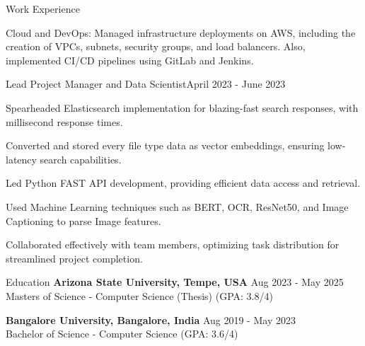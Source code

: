 \documentclass{resume} %
\begin{document}
\begin{rSection}{Work Experience}
\begin{rSubsection}
                                    \item Cloud and DevOps: Managed infrastructure deployments on AWS, including the creation of VPCs, subnets, security groups, and load balancers. Also, implemented CI/CD pipelines using GitLab and Jenkins.
                            \end{rSubsection}
                    \begin{rSubsection}
                {Lead Project Manager and Data Scientist}{April 2023 - June 2023}
                                    {}
                                {}
                                    \item Spearheaded Elasticsearch implementation for blazing{-}fast search responses, with millisecond response times.
                                    \item Converted and stored every file type data as vector embeddings, ensuring low{-}latency search capabilities.
                                    \item Led Python FAST API development, providing efficient data access and retrieval.
                                    \item Used Machine Learning techniques such as BERT, OCR, ResNet50, and Image Captioning to parse Image features.
                                    \item Collaborated effectively with team members, optimizing task distribution for streamlined project completion.
                            \end{rSubsection}
            \end{rSection}

\begin{rSection}{Education}
                        \textbf{Arizona State University, Tempe, USA} \hfill {Aug 2023 - May 2025} \\
                            {Masters of Science {-} Computer Science (Thesis)}
                                        \hfill {(GPA: 3.8/4)}
             
             
         
                        \textbf{Bangalore University, Bangalore, India} \hfill {Aug 2019 - May 2023} \\
                            {Bachelor of Science {-} Computer Science}
                                        \hfill {(GPA: 3.6/4)}
             
             
         
    \end{rSection}
\end{document}
